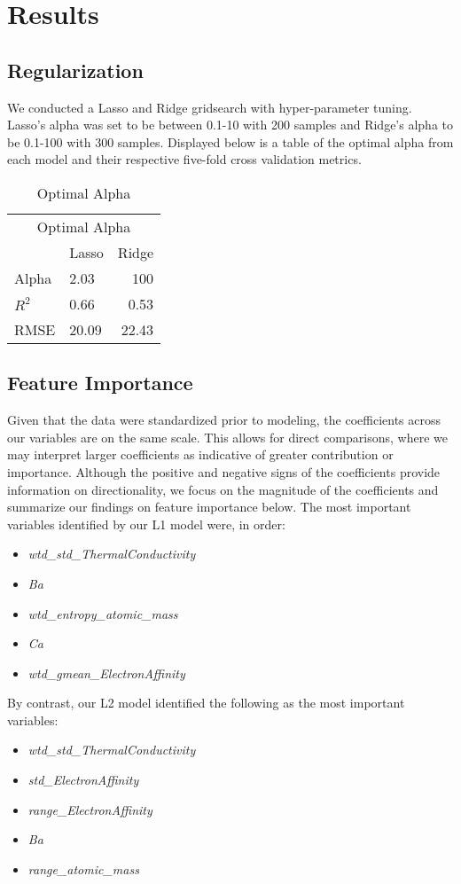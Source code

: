 \documentclass[twoside,twocolumn]{article}
\begin{document}
\section{Results}

\subsection{Regularization}
We conducted a Lasso and Ridge gridsearch with hyper-parameter tuning. Lasso's alpha was set to be between 0.1-10 with 200 samples and Ridge's alpha to be 0.1-100 with 300 samples.
Displayed below is a table of the optimal alpha from each model and their respective five-fold cross validation metrics.\\
\begin{table}[h!]
\centering
\begin{tabular}{llr}
\toprule
\multicolumn{3}{c}{Optimal Alpha} \\
\cmidrule(r){1-3}
        & Lasso & Ridge \\ \midrule
Alpha   & 2.03 & 100 \\
$R^{2}$      & 0.66 & 0.53 \\
RMSE    & 20.09 & 22.43 \\ \bottomrule
\end{tabular}
\caption{Optimal Alpha}
\end{table}

\subsection{Feature Importance}
Given that the data were standardized prior to modeling, the coefficients across our variables are on the same scale. This allows for direct comparisons, where we may interpret larger coefficients as indicative of greater contribution or importance. Although the positive and negative signs of the coefficients provide information on directionality, we focus on the magnitude of the coefficients and summarize our findings on feature importance below. 
The most important variables identified by our L1 model were, in order:
\begin{itemize}
    \item \emph{wtd\_std\_ThermalConductivity}
    \item \emph{Ba}
    \item \emph{wtd\_entropy\_atomic\_mass}
    \item \emph{Ca}
    \item \emph{wtd\_gmean\_ElectronAffinity}
\end{itemize}
By contrast, our L2 model identified the following as the most important variables:
\begin{itemize}
    \item \emph{wtd\_std\_ThermalConductivity}
    \item \emph{std\_ElectronAffinity}
    \item \emph{range\_ElectronAffinity}
    \item \emph{Ba}
    \item \emph{range\_atomic\_mass}
\end{itemize}
\end{document}
